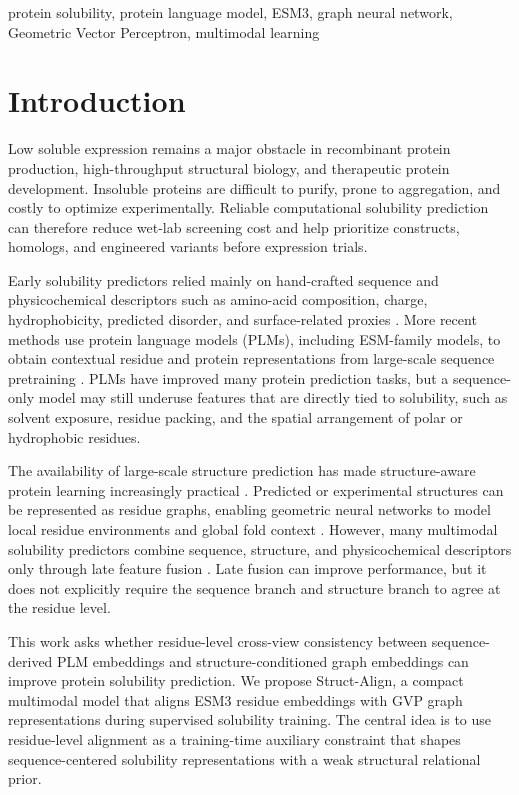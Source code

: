 \documentclass[conference]{IEEEtran}
\begin{document}
\begin{IEEEkeywords}
protein solubility, protein language model, ESM3, graph neural network, Geometric Vector Perceptron, multimodal learning
\end{IEEEkeywords}

\section{Introduction}

Low soluble expression remains a major obstacle in recombinant protein production, high-throughput structural biology, and therapeutic protein development. Insoluble proteins are difficult to purify, prone to aggregation, and costly to optimize experimentally. Reliable computational solubility prediction can therefore reduce wet-lab screening cost and help prioritize constructs, homologs, and engineered variants before expression trials.

Early solubility predictors relied mainly on hand-crafted sequence and physicochemical descriptors such as amino-acid composition, charge, hydrophobicity, predicted disorder, and surface-related proxies \cite{Sormanni2015,Hebditch2017,Khurana2018}. More recent methods use protein language models (PLMs), including ESM-family models, to obtain contextual residue and protein representations from large-scale sequence pretraining \cite{Rives2021,Hayes2025}. PLMs have improved many protein prediction tasks, but a sequence-only model may still underuse features that are directly tied to solubility, such as solvent exposure, residue packing, and the spatial arrangement of polar or hydrophobic residues.

The availability of large-scale structure prediction has made structure-aware protein learning increasingly practical \cite{Jumper2021,Lin2023}. Predicted or experimental structures can be represented as residue graphs, enabling geometric neural networks to model local residue environments and global fold context \cite{Jing2021}. However, many multimodal solubility predictors combine sequence, structure, and physicochemical descriptors only through late feature fusion \cite{Tan2024,Li2024}. Late fusion can improve performance, but it does not explicitly require the sequence branch and structure branch to agree at the residue level.

This work asks whether residue-level cross-view consistency between sequence-derived PLM embeddings and structure-conditioned graph embeddings can improve protein solubility prediction. We propose Struct-Align, a compact multimodal model that aligns ESM3 residue embeddings with GVP graph representations during supervised solubility training. The central idea is to use residue-level alignment as a training-time auxiliary constraint that shapes sequence-centered solubility representations with a weak structural relational prior.
\end{document}
